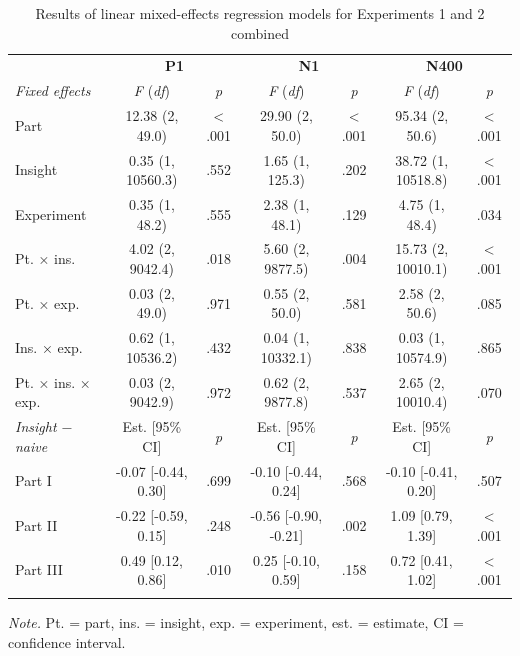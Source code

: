 \documentclass[
  english,
  man,11pt,floatsintext]{apa7}
\begin{document}
\begin{table}[tbp]

\begin{center}
\begin{threeparttable}

\caption{\label{tab:joint-table}Results of linear mixed-effects regression models for Experiments 1 and 2 combined}

\footnotesize{

\begin{tabular}{lcccccc}
\toprule
 & \multicolumn{2}{c}{\textbf{P1}} & \multicolumn{2}{c}{\textbf{N1}} & \multicolumn{2}{c}{\textbf{N400}} \\
\cmidrule(r){2-3} \cmidrule(r){4-5} \cmidrule(r){6-7}
\textit{Fixed effects} & \textit{F} (\textit{df}) & \textit{p} & \textit{F} (\textit{df}) & \textit{p} & \textit{F} (\textit{df}) & \textit{p}\\
\midrule
Part & 12.38 (2, 49.0) & < .001 & 29.90 (2, 50.0) & < .001 & 95.34 (2, 50.6) & < .001\\
Insight & 0.35 (1, 10560.3) & .552 & 1.65 (1, 125.3) & .202 & 38.72 (1, 10518.8) & < .001\\
Experiment & 0.35 (1, 48.2) & .555 & 2.38 (1, 48.1) & .129 & 4.75 (1, 48.4) & .034\\
Pt. × ins. & 4.02 (2, 9042.4) & .018 & 5.60 (2, 9877.5) & .004 & 15.73 (2, 10010.1) & < .001\\
Pt. × exp. & 0.03 (2, 49.0) & .971 & 0.55 (2, 50.0) & .581 & 2.58 (2, 50.6) & .085\\
Ins. × exp. & 0.62 (1, 10536.2) & .432 & 0.04 (1, 10332.1) & .838 & 0.03 (1, 10574.9) & .865\\
Pt. × ins. × exp. & 0.03 (2, 9042.9) & .972 & 0.62 (2, 9877.8) & .537 & 2.65 (2, 10010.4) & .070\\
\textit{Insight $-$  naive} & Est. [95\% CI] & \textit{p} & Est. [95\% CI] & \textit{p} & Est. [95\% CI] & \textit{p}\\ \midrule
Part I & -0.07 [-0.44, 0.30] & .699 & -0.10 [-0.44, 0.24] & .568 & -0.10 [-0.41, 0.20] & .507\\
Part II & -0.22 [-0.59, 0.15] & .248 & -0.56 [-0.90, -0.21] & .002 & 1.09 [0.79, 1.39] & < .001\\
Part III & 0.49 [0.12, 0.86] & .010 & 0.25 [-0.10, 0.59] & .158 & 0.72 [0.41, 1.02] & < .001\\
\bottomrule
\addlinespace
\end{tabular}

}

\begin{tablenotes}[para]
\normalsize{\textit{Note.} Pt. = part, ins. = insight, exp. = experiment, est. = estimate, CI = confidence interval.}
\end{tablenotes}

\end{threeparttable}
\end{center}

\end{table}
\end{document}
